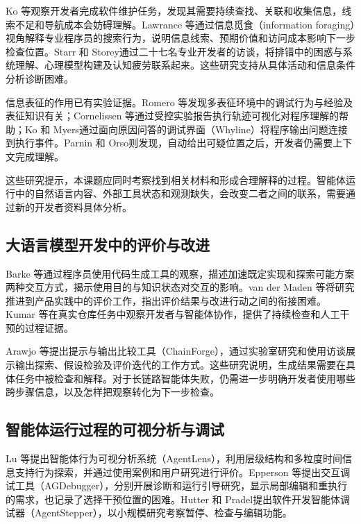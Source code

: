 Ko 等\cite{ref14}观察开发者完成软件维护任务，发现其需要持续查找、关联和收集信息，线索不足和导航成本会妨碍理解。Lawrance 等\cite{ref08}通过信息觅食（information foraging）视角解释专业程序员的搜索行为，说明信息线索、预期价值和访问成本影响下一步检查位置。Starr 和 Storey\cite{ref16}通过二十七名专业开发者的访谈，将排错中的困惑与系统理解、心理模型构建及认知疲劳联系起来。这些研究支持从具体活动和信息条件分析诊断困难。

信息表征的作用已有实验证据。Romero 等\cite{ref34}发现多表征环境中的调试行为与经验及表征知识有关；Cornelissen 等\cite{ref33}通过受控实验报告执行轨迹可视化对程序理解的帮助；Ko 和 Myers\cite{ref07}通过面向原因问答的调试界面（Whyline）将程序输出问题连接到执行事件。Parnin 和 Orso\cite{ref35}则发现，自动给出可疑位置之后，开发者仍需要上下文完成理解。

这些研究提示，本课题应同时考察找到相关材料和形成合理解释的过程。智能体运行中的自然语言内容、外部工具状态和观测缺失，会改变二者之间的联系，需要通过新的开发者资料具体分析。

\subsection{大语言模型开发中的评价与改进}

Barke 等\cite{ref64}通过程序员使用代码生成工具的观察，描述加速既定实现和探索可能方案两种交互方式，揭示使用目的与知识状态对交互的影响。van der Maden 等\cite{ref01}将研究推进到产品实践中的评价工作，指出评价结果与改进行动之间的衔接困难。Kumar 等\cite{ref59}在真实仓库任务中观察开发者与智能体协作，提供了持续检查和人工干预的过程证据。

Arawjo 等\cite{arawjo2024chainforge}提出提示与输出比较工具（ChainForge），通过实验室研究和使用访谈展示输出探索、假设检验及评价迭代的工作方式。这些研究说明，生成结果需要在具体任务中被检查和解释。对于长链路智能体失败，仍需进一步明确开发者使用哪些跨步骤信息，以及怎样把观察转化为下一步检查。

\subsection{智能体运行过程的可视分析与调试}

Lu 等\cite{ref22}提出智能体行为可视分析系统（AgentLens），利用层级结构和多粒度时间信息支持行为探索，并通过使用案例和用户研究进行评价。Epperson 等\cite{ref02}提出交互调试工具（AGDebugger），分别开展诊断和运行引导研究，显示局部编辑和重执行的需求，也记录了选择干预位置的困难。Hutter 和 Pradel\cite{ref18}提出软件开发智能体调试器（AgentStepper），以小规模研究考察暂停、检查与编辑功能。

